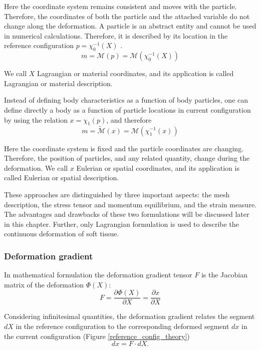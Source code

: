 Here the coordinate system remains consistent and moves with the particle. Therefore, the coordinates of both the particle and the attached variable do not change along the deformation. A particle is an abstract entity and cannot be used in numerical calculations. Therefore, it is described by its location in the reference configuration $p= \chi_0^{-1}(X)$ .
\begin{equation}
 m =  \mathcal{M}(p) = \mathcal{M}(\chi_0^{-1}(X))
\end{equation}

 We call $X$ Lagrangian or material coordinates, and its application is called Lagrangian or material description.  
 

Instead of defining body characteristics as a function of body particles, one can define directly a body as a function of particle locations in current configuration by using the relation $ x = \chi_1(p)$, and therefore 
\begin{equation}
m = \tilde{ \mathcal{M}}(x) = \mathcal{M}(\chi_1^{-1}(x))
\end{equation}

 Here the coordinate system is fixed and the particle coordinates are changing. Therefore, the position of particles, and any related quantity, change during the deformation. We call $x$ Eulerian or spatial coordinates, and its application is called Eulerian or spatial description.
 
 These approaches are distinguished by three important aspects: the mesh description, the stress tensor and momentum equilibrium, and the strain measure. The advantages and drawbacks of these two formulations will be discussed later in this chapter. Further, only Lagrangian formulation is used to describe the continuous deformation of soft tissue.       

\subsubsection*{Deformation gradient}\label{deformatiogradient}

In mathematical formulation the deformation gradient tensor $F$ is the Jacobian matrix of the deformation $\Phi(X)$:
\begin{equation}
F = \frac{\partial \Phi (X)}{\partial X} = \frac{\partial x}{\partial X}
\end{equation}

Considering infinitesimal quantities, the deformation gradient relates the segment $dX$ in the reference configuration to the corresponding deformed segment $dx$ in the current configuration (Figure \ref{reference_config_theory}) 
\begin{equation}
dx = F \cdot dX.
\label{deformationGradRelation}
\end{equation}

